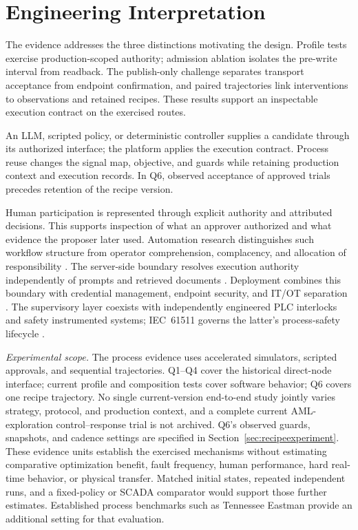 \section{Engineering Interpretation}
\label{sec:limits}
The evidence addresses the three distinctions motivating the design.
Profile tests exercise production-scoped authority; admission ablation
isolates the pre-write interval from readback. The publish-only challenge
separates transport acceptance from endpoint confirmation, and paired
trajectories link interventions to observations and retained recipes.
These results support an inspectable execution contract on the exercised
routes.

An LLM, scripted policy, or deterministic controller supplies a candidate
through its authorized interface; the platform applies the execution
contract. Process reuse changes the signal map, objective, and guards while
retaining production context and execution records. In Q6, observed
acceptance of approved trials precedes retention of the recipe version.

Human participation is represented through explicit authority and
attributed decisions. This supports inspection of what an approver
authorized and what evidence the proposer later used. Automation research
distinguishes such workflow structure from operator comprehension,
complacency, and allocation of responsibility
\cite{parasuramanmanzey2010complacency,parasuraman2000model,bainbridge1983ironies}.
The server-side boundary resolves execution authority independently of
prompts and retrieved documents \cite{greshake2023injection,liu2024pinjection}.
Deployment combines this boundary with credential management, endpoint
security, and IT/OT separation \cite{iec62443-3-3}. The supervisory layer
coexists with independently engineered PLC interlocks and safety
instrumented systems; IEC~61511 governs the latter's process-safety
lifecycle \cite{iec61511}.

\noindent\textit{Experimental scope.}
The process evidence uses accelerated simulators, scripted approvals, and
sequential trajectories. Q1--Q4 cover the historical direct-node interface;
current profile and composition tests cover software behavior; Q6 covers
one recipe trajectory. No single current-version end-to-end study jointly
varies strategy, protocol, and production context, and a complete current
AML-exploration control--response trial is not archived. Q6's observed
guards, snapshots, and cadence settings
are specified in Section~\ref{sec:recipeexperiment}. These evidence units
establish the exercised
mechanisms without estimating comparative optimization benefit, fault
frequency, human performance, hard real-time behavior, or physical transfer.
Matched initial states, repeated independent runs, and a fixed-policy or
SCADA comparator would support those further estimates. Established process
benchmarks such as Tennessee Eastman \cite{downs1993tep} provide an
additional setting for that evaluation.

